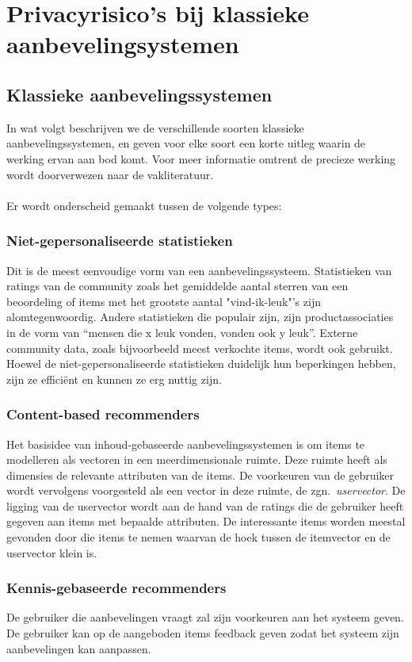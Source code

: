 \chapter{Privacyrisico's bij klassieke aanbevelingsystemen}
\label{privacyklassiek}

\section{Klassieke aanbevelingssystemen}
\label{sec:klassiek}
In wat volgt beschrijven we de verschillende soorten klassieke aanbevelingssystemen, en geven voor elke soort een korte uitleg waarin de werking ervan aan bod komt. Voor meer informatie omtrent de precieze werking wordt doorverwezen naar de vakliteratuur. \\
\\
Er wordt onderscheid gemaakt tussen de volgende types:
\subsection{Niet-gepersonaliseerde statistieken}
Dit is de meest eenvoudige vorm van een aanbevelingssysteem. Statistieken van ratings van de community zoals het gemiddelde aantal sterren van een beoordeling of items met het grootste aantal "vind-ik-leuk"'s zijn alomtegenwoordig. Andere statistieken die populair zijn, zijn productassociaties in de vorm van “mensen die x leuk vonden, vonden ook y leuk”. Externe community data, zoals bijvoorbeeld meest verkochte items, wordt ook gebruikt. Hoewel de niet-gepersonaliseerde statistieken duidelijk hun beperkingen hebben, zijn ze effici\"ent en kunnen ze erg nuttig zijn. 
\subsection{Content-based recommenders}
Het basisidee van inhoud-gebaseerde aanbevelingssystemen is om items te modelleren als vectoren in een meerdimensionale ruimte. Deze ruimte heeft als dimensies de relevante attributen van de items. De voorkeuren van de gebruiker wordt vervolgens voorgesteld als een vector in deze ruimte, de zgn.~\textit{uservector}. De ligging van de uservector wordt aan de hand van de ratings die de gebruiker heeft gegeven aan items met bepaalde attributen. De interessante items worden meestal gevonden door die items te nemen waarvan de hoek tussen de itemvector en de uservector klein is. 
\subsection{Kennis-gebaseerde recommenders}
De gebruiker die aanbevelingen vraagt zal zijn voorkeuren aan het systeem geven. De gebruiker kan op de aangeboden items feedback geven zodat het systeem zijn aanbevelingen kan aanpassen.
